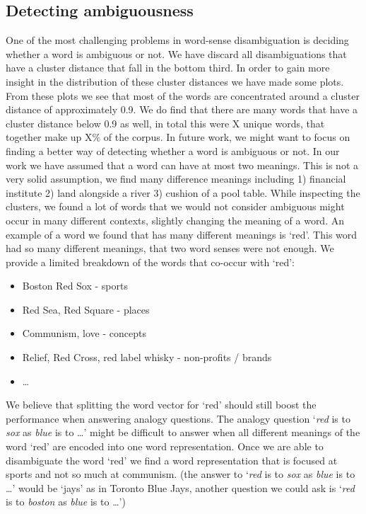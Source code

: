 \documentclass[11pt]{article}
\begin{document}
\subsection{Detecting ambiguousness}
One of the most challenging problems in word-sense disambiguation is deciding whether a word is ambiguous or not. We have discard all disambiguations that have a cluster distance that fall in the bottom third. In order to gain more insight in the distribution of these cluster distances we have made some plots. From these plots we see that most of the words are concentrated around a cluster distance of approximately 0.9. We do find that there are many words that have a cluster distance below 0.9 as well, in total this were X unique words, that together make up X$\%$ of the corpus. In future work, we might want to focus on finding a better way of detecting whether a word is ambiguous or not. 
In our work we have assumed that a word can have at most two meanings. This is not a very solid assumption, we find many difference meanings including 1) financial institute 2) land alongside a river 3) cushion of a pool table. While inspecting the clusters, we found a lot of words that we would not consider ambiguous might occur in many different contexts, slightly changing the meaning of a word. An example of a word we found that has many different meanings is `red'. This word had so many different meanings, that two word senses were not enough. We provide a limited breakdown of the words that co-occur with `red':
\begin{itemize}
\item Boston Red Sox - sports
\item Red Sea, Red Square - places
\item Communism, love - concepts
\item Relief, Red Cross, red label whisky - non-profits / brands
\item \dots
\end{itemize} 
We believe that splitting the word vector for `red' should still boost the performance when answering analogy questions. The analogy question `\textit{red} is to \textit{sox} as \textit{blue} is to \dots' might be difficult to answer when all different meanings of the word `red' are encoded into one word representation. Once we are able to disambiguate the word `red' we find a word representation that is focused at sports and not so much at communism. (the answer to `\textit{red} is to \textit{sox} as \textit{blue} is to \dots' would be `jays' as in Toronto Blue Jays, another question we could ask is `\textit{red} is to \textit{boston} as \textit{blue} is to \dots')
 
\end{document}
